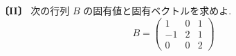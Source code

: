 \noindent\textbf{〔II〕}
次の行列 $B$ の固有値と固有ベクトルを求めよ.
\[
B=\begin{pmatrix}
1 & 0 & 1\\
-1 & 2 & 1\\
0 & 0 & 2
\end{pmatrix}
\]
